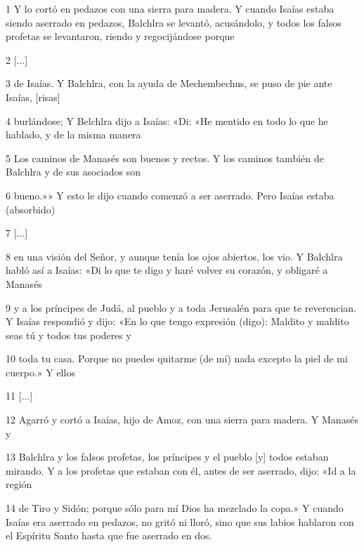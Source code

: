 \par 1 Y lo cortó en pedazos con una sierra para madera. Y cuando Isaías estaba siendo aserrado en pedazos, Balchlra se levantó, acusándolo, y todos los falsos profetas se levantaron, riendo y regocijándose porque

\par 2 [...]

\par 3 de Isaías. Y Balchlra, con la ayuda de Mechembechus, se puso de pie ante Isaías, [risas]

\par 4 burlándose; Y Belchlra dijo a Isaías: «Di: «He mentido en todo lo que he hablado, y de la misma manera

\par 5 Los caminos de Manasés son buenos y rectos. Y los caminos también de Balchlra y de sus asociados son

\par 6 bueno.»» Y esto le dijo cuando comenzó a ser aserrado. Pero Isaías estaba (absorbido)

\par 7 [...]

\par 8 en una visión del Señor, y aunque tenía los ojos abiertos, los vio. Y Balchlra habló así a Isaías: «Di lo que te digo y haré volver su corazón, y obligaré a Manasés

\par 9 y a los príncipes de Judá, al pueblo y a toda Jerusalén para que te reverencian. Y Isaías respondió y dijo: «En lo que tengo expresión (digo): Maldito y maldito seas tú y todos tus poderes y

\par 10 toda tu casa. Porque no puedes quitarme (de mí) nada excepto la piel de mi cuerpo.» Y ellos

\par 11 [...]

\par 12 Agarró y cortó a Isaías, hijo de Amoz, con una sierra para madera. Y Manasés y

\par 13 Balchlra y los falsos profetas, los príncipes y el pueblo [y] todos estaban mirando. Y a los profetas que estaban con él, antes de ser aserrado, dijo: «Id a la región

\par 14 de Tiro y Sidón; porque sólo para mí Dios ha mezclado la copa.» Y cuando Isaías era aserrado en pedazos, no gritó ni lloró, sino que sus labios hablaron con el Espíritu Santo hasta que fue aserrado en dos.

